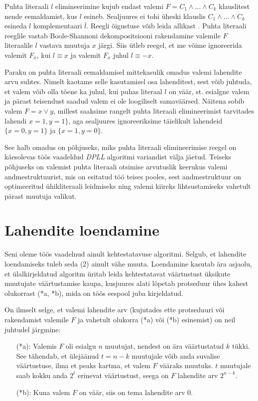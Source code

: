 Puhta literaali $l$ elimineerimine kujub endast valemi $F=C_1\wedge\dots\wedge
C_k$ klauslitest nende eemaldamist, kus $l$ esineb. Sealjuures ei tohi
üheski klauslis $C_1\wedge\dots\wedge C_k$ esineda $l$ komplementaari $\bar{l}$.
Reegli õigustuse võib leida allikast \cite{tombak07}. Puhta literaali reeglile
vastab Boole-Shannoni dekompositsiooni rakendamine valemile $F$ literaalile $l$
vastava muutuja $x$ järgi. Siis ütleb reegel, et me võime ignoreerida valemit
$F_{\bar{x}}$, kui $l\equiv x$ ja valemit $F_x$ juhul $l\equiv -x$.

Paraku on puhta literaali eemaldamisel mittekasulik omadus
valemi lahendite arvu suhtes. Nimelt kaotame selle kasutamisel osa lahenditest,
sest võib juhtuda, et valem võib olla tõene ka juhul, kui puhas literaal $l$ on
väär, st. esialgne valem ja pärast teisendust saadud valem ei ole loogiliselt
samaväärsed. Näitena sobib valem $F=x\vee y$, millest saaksime rangelt
puhta literaali elimineerimist tarvitades lahendi $x=1, y=1\}$, aga sealjuures
ignoreeriksime täielikult lahendeid $\{x=0, y=1\}$ ja $\{x=1, y=0\}$.

See halb omadus on põhjuseks, miks puhta literaali elimineerimise reegel on
käesolevas töös vaadeldud \textit{DPLL} algoritmi variandist välja jäetud.
Teiseks põhjuseks on valemist puhta literaali otsimise arvutuslik keerukus
valemi andmestruktuurist, mis on esitatud töö teises pooles, sest andmestruktuur on
optimeeritud ühikliteraali leidmiseks ning valemi kiireks lihtsustamiseks
vahetult pärast muutuja valikut.


\section{Lahendite loendamine}

Seni oleme töös vaadelnud ainult kehtestatavuse algoritmi. Selgub, et
lahendite loendamiseks tuleb seda (2) ainult vähe muuta.
Loendamine kasutab ära asjaolu, et ülalkirjeldatud algoritm üritab leida
kehtestatavat väärtustust üksikute muutujate väärtustamise kaupa, kusjuures
alati lõpetab protseduur ühes kahest olukorrast (*a, *b), mida on töös eespool
juba kirjeldatud.

On ilmselt selge, et valemi lahendite arv (kujutades ette protseduuri
 või  rakendamist valemile $F$ ja vahetult olukorra (*a)
või (*b) esinemist) on neil juhtudel järgmine:

\begin{itemize}
  \item[(*a):] Valemis $F$ oli esialgu $n$ muutujat, nendest
  on ära väärtustatud $k$ tükki. See tähendab, et ülejäänud $t=n-k$ muutujale võib anda
  suvalise väärtustuse, ilma et peaks kartma, et valem $F$ vääraks muutuks. $t$
  muutujale saab kokku anda $2^t$ erinevat väärtustust, seega on $F$
  lahendite arv $2^{n-k}$.
  \item[(*b):] Kuna valem $F$ on väär, siis on tema lahendite arv 0.
\end{itemize}

